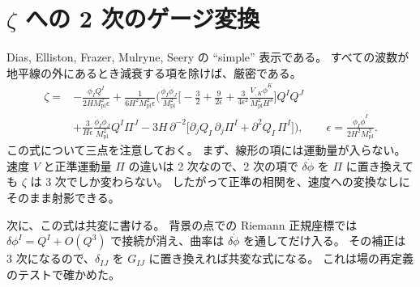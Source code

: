 \documentclass[a4paper,11pt]{ltjsarticle}
\newcommand{\Mpl}{M_{\mathrm{pl}}}
\begin{document}
\section{\texorpdfstring{$\zeta$}{ζ} への 2 次のゲージ変換}
\label{app:gauge}

Dias, Elliston, Frazer, Mulryne, Seery\cite{DEFMS2015} の ``simple'' 表示である。
すべての波数が地平線の外にあるとき減衰する項を除けば、厳密である。
\begin{align*}
\zeta={}&-\frac{\dot\phi_IQ^I}{2H\Mpl^2\epsilon}
+\frac{1}{6H^2\Mpl^2\epsilon}\bigg(\frac{\dot\phi_I\dot\phi_J}{\Mpl^2}\Big[-\frac32+\frac9{2\epsilon}+\frac{3}{4\epsilon^2}\frac{V_{,K}\dot\phi^K}{\Mpl^2H^3}\Big]Q^IQ^J\\
&+\frac{3}{H\epsilon}\frac{\dot\phi_I\dot\phi_J}{\Mpl^2}Q^I\Pi^J-3H\,\partial^{-2}\big[\partial_jQ_I\,\partial_j\Pi^I+\partial^2Q_I\,\Pi^I\big]\bigg),
\qquad\epsilon=\frac{\dot\phi_I\dot\phi^I}{2H^2\Mpl^2}.
\end{align*}
この式について三点を注意しておく。
まず、線形の項には運動量が入らない。
速度 $V$ と正準運動量 $\Pi$ の違いは 2 次なので、2 次の項で $\delta\dot\phi$ を $\Pi$ に置き換えても $\zeta$ は 3 次でしか変わらない。
したがって正準の相関を、速度への変換なしにそのまま射影できる。

次に、この式は共変に書ける。
背景の点での Riemann 正規座標では $\delta\phi^I=Q^I+O(Q^3)$ で接続が消え、曲率は $\delta\dot\phi$ を通してだけ入る。
その補正は 3 次になるので、$\delta_{IJ}$ を $G_{IJ}$ に置き換えれば共変な式になる。
これは場の再定義のテストで確かめた。
\end{document}
